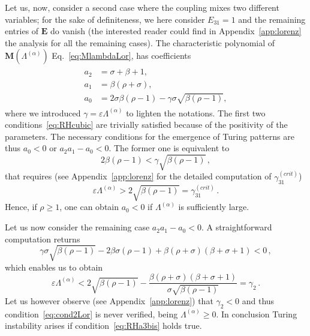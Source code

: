 \documentclass[aps,showpacs,preprintnumbers,amsmath,amssymb,twocolumn,superscriptaddress,floatfix,nofootinbib,10pt,pre]{revtex4-1}
\begin{document}
Let us, now, consider a second case where the coupling mixes two different variables; for the sake of definiteness, we here consider ${E}_{31}=1$ and the remaining entries of $\mathbf{E}$ do vanish (the interested reader could find in Appendix~\ref{app:lorenz} the analysis for all the remaining cases). The characteristic polynomial of $\mathbf{M}(\Lambda^{(\alpha)})$ Eq.~\eqref{eq:MlambdaLor}, has coefficients
\begin{align}
\begin{aligned}
a_2 &= \sigma+\beta+1,\\
a_1 &= \beta(\rho+\sigma),\\
a_0 &= 2\sigma\beta(\rho-1)-\gamma\sigma\sqrt{\beta(\rho-1)},
\end{aligned}
\end{align}
where we introduced $\gamma=\varepsilon \Lambda^{(\alpha)}$ to lighten the notations. The first two conditions~\eqref{eq:RHcubic} are trivially satisfied because of the positivity of the parameters. The necessary conditions for the emergence of Turing patterns are thus $a_0<0$ or $a_2a_1-a_0<0$. The former one is equivalent to
\begin{equation}
    \label{eq:RHa3}
    2\beta(\rho-1)<\gamma\sqrt{\beta(\rho-1)}\, ,
\end{equation}
that requires (see Appendix~\ref{app:lorenz} for the detailed computation of $\gamma^{(crit)}_{31}$)
\begin{equation}
    \label{eq:RHa3bis}
    \varepsilon \Lambda^{(\alpha)} > 2\sqrt{\beta(\rho-1)}=\gamma^{(crit)}_{31}\, .
\end{equation}
Hence, if $\rho\ge 1$, one can obtain $a_0<0$ if $\Lambda^{(\alpha)}$ is sufficiently large. 

Let us now consider the remaining case $a_2a_1-a_0<0$. A straightforward computation returns
\begin{equation}
    \gamma\sigma\sqrt{\beta(\rho-1)}-2\beta\sigma(\rho-1)+\beta(\rho+\sigma)(\beta+\sigma+1)<0 \, ,
\end{equation}
which enables us to obtain
\begin{equation}
    \label{eq:cond2Lor}
    \varepsilon\Lambda^{(\alpha)}<2\sqrt{\beta(\rho-1)}-\frac{\beta(\rho+\sigma)(\beta+\sigma+1)}{\sigma\sqrt{\beta(\rho-1)}}=\gamma_2\, .
\end{equation}
Let us however observe (see Appendix~\ref{app:lorenz}) that $\gamma_2<0$ and thus condition~\eqref{eq:cond2Lor} is never verified, being $\Lambda^{(\alpha)}\geq 0$. In conclusion Turing instability arises if condition~\eqref{eq:RHa3bis} holds true.
\end{document}
